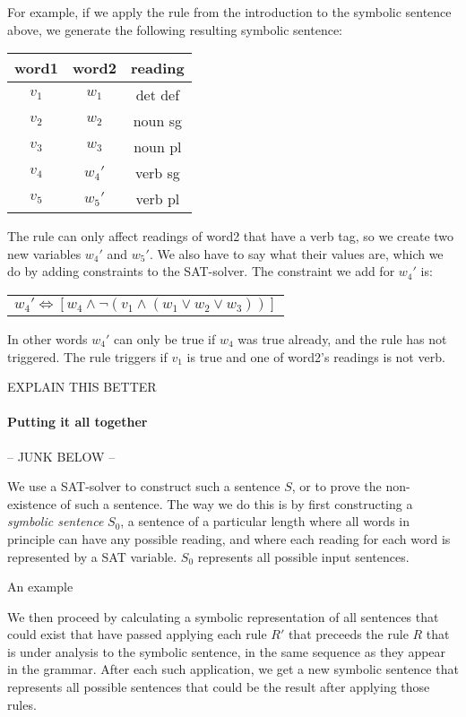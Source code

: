 For example, if we apply the rule from the introduction to the symbolic sentence above, we generate the following resulting symbolic sentence:
\begin{center}
\begin{tabular}{c|c|c}
word1 & word2 & reading \\
\hline
$v_1$ & $w_1$ & det def \\
$v_2$ & $w_2$ & noun sg \\
$v_3$ & $w_3$ & noun pl \\
$v_4$ & $w_4'$ & verb sg \\
$v_5$ & $w_5'$ & verb pl \\
\end{tabular}
\end{center}
The rule can only affect readings of word2 that have a verb tag, so we create two new variables $w_4'$ and $w_5'$. We also have to say what their values are, which we do by adding constraints to the SAT-solver. The constraint we add for $w_4'$ is:
\begin{center}
\begin{tabular}{c}
$w_4' \Leftrightarrow [ w_4 \wedge \neg{}(v_1 \wedge (w_1 \vee w_2 \vee w_3)) ]$ \\
\end{tabular}
\end{center}
In other words $w_4'$ can only be true if $w_4$ was true already, and the rule has not triggered. The rule triggers if $v_1$ is true and one of word2's readings is not verb.

EXPLAIN THIS BETTER


\paragraph{Putting it all together}


-- JUNK BELOW --

We use a SAT-solver to construct such a sentence $S$, or to prove the non-existence of such a sentence. The way we do this is by first constructing a {\em symbolic sentence} $S_0$, a sentence of a particular length where all words in principle can have any possible reading, and where each reading for each word is represented by a SAT variable. $S_0$ represents all possible input sentences.

An example 


We then proceed by calculating a symbolic representation of all sentences that could exist that have passed applying each rule $R'$ that preceeds the rule $R$ that is under analysis to the symbolic sentence, in the same sequence as they appear in the grammar. After each such application, we get a new symbolic sentence that represents all possible sentences that could be the result after applying those rules. 







